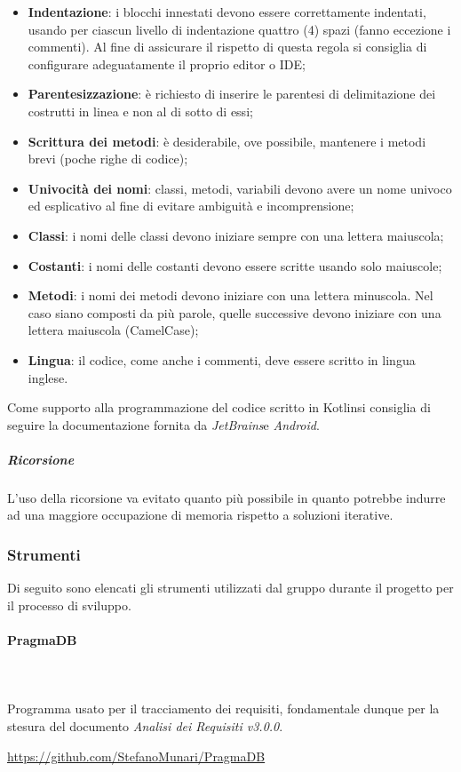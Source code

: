 			\begin{itemize}
				\item \textbf{Indentazione}: i blocchi innestati devono essere correttamente indentati, usando per ciascun livello di indentazione quattro (4) spazi (fanno eccezione i commenti). Al fine di assicurare il rispetto di questa regola si consiglia di configurare adeguatamente il proprio editor o IDE;
				\item \textbf{Parentesizzazione}: è richiesto di inserire le parentesi di delimitazione dei costrutti in linea e non al di sotto di essi;
				\item \textbf{Scrittura dei metodi}: è desiderabile, ove possibile, mantenere i metodi brevi (poche righe di codice);
				\item \textbf{Univocità dei nomi}: classi, metodi, variabili devono avere un nome univoco	 ed esplicativo al fine di evitare ambiguità e incomprensione;
				\item \textbf{Classi}: i nomi delle classi devono iniziare sempre con una lettera maiuscola;
				\item \textbf{Costanti}: i nomi delle costanti devono essere scritte usando solo maiuscole;
				\item \textbf{Metodi}: i nomi dei metodi devono iniziare con una lettera minuscola. Nel caso
				siano composti da più parole, quelle successive devono iniziare con una lettera maiuscola (CamelCase\glo{});
				\item \textbf{Lingua}: il codice, come anche i commenti, deve essere scritto in lingua inglese.
			\end{itemize}
			Come supporto alla programmazione del codice scritto in Kotlin\glosp si consiglia di seguire la documentazione fornita da \textit{JetBrains}\glosp e \textit{Android}\glo. \newline \newline
			\subparagraph{Ricorsione}
			L'uso della ricorsione va evitato quanto più possibile in  quanto  potrebbe
			indurre  ad  una  maggiore  occupazione  di  memoria  rispetto  a  soluzioni
			iterative.
			
	\subsubsection{Strumenti}
	Di seguito sono elencati gli strumenti utilizzati dal gruppo durante il progetto per il processo di sviluppo.	
		\paragraph{PragmaDB} \mbox{}\\ \mbox{}\\
		Programma usato per il tracciamento dei requisiti, fondamentale dunque per la stesura del documento \textit{Analisi dei Requisiti v3.0.0}. \newline
		\centerline{\url{https://github.com/StefanoMunari/PragmaDB}}
